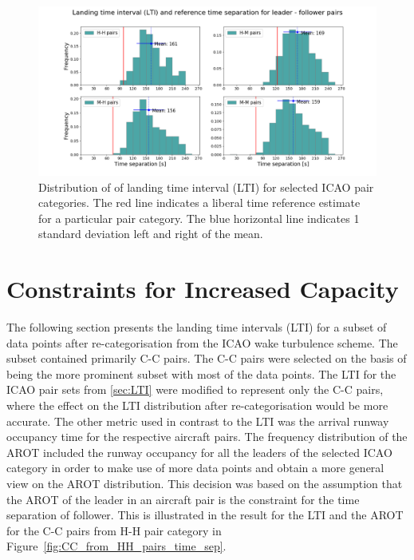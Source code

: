 \begin{figure}[h]
    \centering
    \includegraphics[width=1\textwidth]{graphics/fig_time_separ_HH_HM_MH_MM_pairs.png}
    \caption[Distribution of landing time interval (LTI) for ICAO pairs]{Distribution of of landing time interval (LTI) for selected ICAO pair categories. The red line indicates a liberal time reference estimate for a particular pair category. The blue horizontal line indicates 1 standard deviation left and right of the mean.}
    \label{fig:time_separ_HH_HM_MH_MM_pairs}
\end{figure}



\section{Constraints for Increased Capacity}%

The following section presents the landing time intervals (LTI) for a subset of data points after re-categorisation from the ICAO wake turbulence scheme. The subset contained primarily C-C pairs. The C-C pairs were selected on the basis of being the more prominent subset with most of the data points. The LTI for the ICAO pair sets from \ref{sec:LTI} were modified to represent only the C-C pairs, where the effect on the LTI distribution after re-categorisation would be more accurate. The other metric used in contrast to the LTI was the arrival runway occupancy time for the respective aircraft pairs. The frequency distribution of the AROT included the runway occupancy for all the leaders of the selected ICAO category in order to make use of more data points and obtain a more general view on the AROT distribution. This decision was based on the assumption that the AROT of the leader in an aircraft pair is the constraint for the time separation of follower. This is illustrated in the result for the LTI and the AROT for the C-C pairs from H-H pair category in Figure~\ref{fig:CC_from_HH_pairs_time_sep}. 

